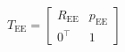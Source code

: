 \documentclass[border=4pt]{standalone}
\begin{document}
{\fontsize{20}{25}\selectfont $\displaystyle
T_{\mathrm{EE}}=
\begin{bmatrix}
R_{\mathrm{EE}} & p_{\mathrm{EE}}\\
0^{\top} & 1
\end{bmatrix}
$}
\end{document}
